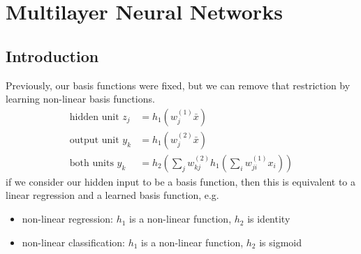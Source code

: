 \documentclass[]{article}
\theoremstyle{definition}
\begin{document}
    \section{Multilayer Neural Networks}
    \label{sec:multilayer_neural_networks}

    \subsection{Introduction}
    Previously, our basis functions were fixed, but we can remove that restriction by learning non-linear basis functions.
    \begin{align*}
        \label{eq:}
        \text{hidden unit } z_j &= h_1 (w_j^{(1)} \bar x) \\
        \text{output unit } y_k &= h_1 (w_j^{(2)} \bar x)  \\
        \text{both units } y_k &= h_2(\sum_j w_{kj}^{(2)} h_1 (\sum_i w_{ji}^{(1)} x_i))
    \end{align*}
    if we consider our hidden input to be a basis function, then this is equivalent to a linear regression and a learned basis function, e.g.
    \begin{itemize}
        \item non-linear regression: $h_1$ is a non-linear function, $h_2$ is identity
        \item non-linear classification: $h_1$ is a non-linear function, $h_2$ is sigmoid
    \end{itemize}
\end{document}
